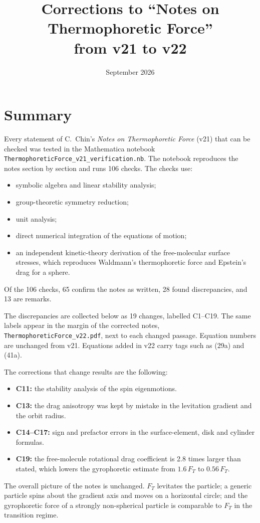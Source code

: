 \documentclass[11pt]{article}
\title{Corrections to ``Notes on Thermophoretic Force''\\[4pt]\large from v21 to v22}
\author{}
\date{September 2026}
\begin{document}
\maketitle
\vspace{-2em}

\section*{Summary}
Every statement of C.~Chin's \emph{Notes on Thermophoretic Force} (v21) that can be checked was tested in the Mathematica notebook \texttt{ThermophoreticForce\_v21\_verification.nb}. The notebook reproduces the notes section by section and runs 106 checks. The checks use:
\begin{itemize}
  \item symbolic algebra and linear stability analysis;
  \item group-theoretic symmetry reduction;
  \item unit analysis;
  \item direct numerical integration of the equations of motion;
  \item an independent kinetic-theory derivation of the free-molecular surface stresses, which reproduces Waldmann's thermophoretic force and Epstein's drag for a sphere.
\end{itemize}
Of the 106 checks, 65 confirm the notes as written, 28 found discrepancies, and 13 are remarks.

The discrepancies are collected below as 19 changes, labelled C1--C19. The same labels appear in the margin of the corrected notes, \texttt{ThermophoreticForce\_v22.pdf}, next to each changed passage. Equation numbers are unchanged from v21. Equations added in v22 carry tags such as (29a) and (41a).

The corrections that change results are the following:
\begin{itemize}
  \item \textbf{C11:} the stability analysis of the spin eigenmotions.
  \item \textbf{C13:} the drag anisotropy was kept by mistake in the levitation gradient and the orbit radius.
  \item \textbf{C14--C17:} sign and prefactor errors in the surface-element, disk and cylinder formulas.
  \item \textbf{C19:} the free-molecule rotational drag coefficient is 2.8 times larger than stated, which lowers the gyrophoretic estimate from $1.6\,F_T$ to $0.56\,F_T$.
\end{itemize}
The overall picture of the notes is unchanged. $F_T$ levitates the particle; a generic particle spins about the gradient axis and moves on a horizontal circle; and the gyrophoretic force of a strongly non-spherical particle is comparable to $F_T$ in the transition regime.
\end{document}
